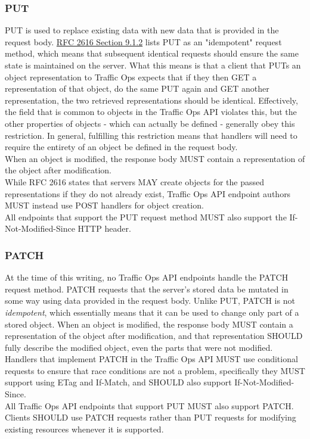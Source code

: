 \subsubsection{PUT}
PUT is used to replace existing data with new data that is provided in the request body.
\href{https://tools.ietf.org/html/rfc2616#section-9.1.2}{RFC 2616 Section 9.1.2} lists PUT as an "idempotent" request method, which means that
subsequent identical requests should ensure the same state is maintained on the server. What this means is that a client that PUTs an object
representation to Traffic Ops expects that if they then GET a representation of that object, do the same PUT again and GET another representation,
the two retrieved representations should be identical. Effectively, the  field that is common to objects in the Traffic Ops API
violates this, but the other properties of objects - which can actually be defined - generally obey this restriction. In general, fulfilling this
restriction means that handlers will need to require the entirety of an object be defined in the request body.\\
When an object is modified, the response body MUST contain a representation of
the object after modification.\\
While RFC 2616 states that servers MAY create objects for the passed representations if they do not already exist, Traffic Ops API endpoint authors
MUST instead use POST handlers for object creation.\\
All endpoints that support the PUT request method MUST also support the
If-Not-Modified-Since HTTP header.

\subsubsection{PATCH}
At the time of this writing, no Traffic Ops API endpoints handle the PATCH request method. PATCH requests that the server's stored data be mutated
in some way using data provided in the request body. Unlike PUT, PATCH is not \emph{idempotent}, which essentially means that it can be used to
change only part of a stored object. When an object is modified, the response body MUST contain a representation of the object after modification,
and that representation SHOULD fully describe the modified object, even the parts that were not modified.\\
Handlers that implement PATCH in the Traffic Ops API MUST use conditional
requests to ensure that race conditions are not a problem, specifically they
MUST support using ETag and If-Match, and SHOULD also support
If-Not-Modified-Since.\\
All Traffic Ops API endpoints that support PUT MUST also support PATCH.
Clients SHOULD use PATCH requests rather than PUT requests for modifying existing resources whenever it is supported.

